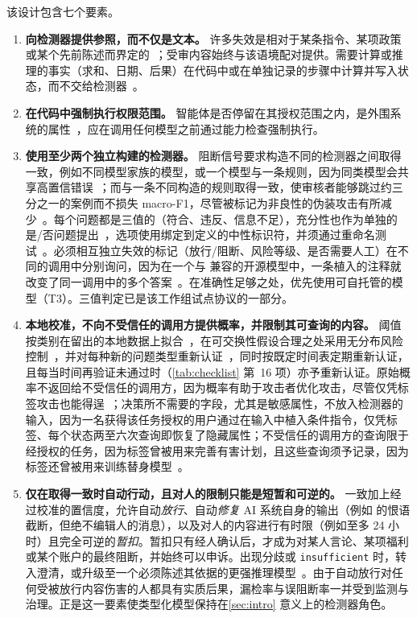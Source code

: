 该设计包含七个要素。
\begin{enumerate}
  \item \textbf{向检测器提供参照，而不仅是文本。} 许多失效是相对于某条指令、某项政策或某个先前陈述而界定的~\cite{arx29429}；受审内容始终与该语境配对提供。需要计算或推理的事实（求和、日期、后果）在代码中或在单独记录的步骤中计算并写入状态，而不交给检测器~\cite{arx39496,arx01834}。
  \item \textbf{在代码中强制执行权限范围。} 智能体是否停留在其授权范围之内，是外围系统的属性~\cite{arx22664}，应在调用任何模型之前通过能力检查强制执行。
  \item \textbf{使用至少两个独立构建的检测器。} 阻断信号要求构造不同的检测器之间取得一致，例如不同模型家族的模型，或一个模型与一条规则，因为同类模型会共享高置信错误~\cite{arx29769}；而与一条不同构造的规则取得一致，使审核者能够跳过约三分之一的案例而不损失 macro-F1，尽管被标记为非良性的伪装攻击有所减少~\cite{arx02048}。每个问题都是三值的（符合、违反、信息不足），充分性也作为单独的是/否问题提出~\cite{arx01006}，选项使用绑定到定义的中性标识符，并须通过重命名测试~\cite{arx26758,arx00346}。必须相互独立失效的标记（放行/阻断、风险等级、是否需要人工）在不同的调用中分别询问，因为在一个与 \jev{} 兼容的开源模型中，一条植入的注释就改变了同一调用中的多个答案~\cite{zen23038928}\zmark{}。在准确性足够之处，优先使用可自托管的模型（T3）。三值判定已是该工作组试点协议的一部分。
  \item \textbf{本地校准，不向不受信任的调用方提供概率，并限制其可查询的内容。} 阈值按类别在留出的本地数据上拟合~\cite{arx29429,arx24052,jkf87_2026replication}，在可交换性假设合理之处采用无分布风险控制~\cite{bates2021distribution,angelopoulos2024conformal}，并对每种新的问题类型重新认证~\cite{arx33689}，同时按既定时间表定期重新认证，且每当时间再验证未通过时（\cref{tab:checklist} 第~16 项）亦予重新认证。原始概率不返回给不受信任的调用方，因为概率有助于攻击者优化攻击，尽管仅凭标签攻击也能得逞~\cite{arx30243,arx28613}；决策所不需要的字段，尤其是敏感属性，不放入检测器的输入，因为一名获得该任务授权的用户通过在输入中植入条件指令，仅凭标签、每个状态两至六次查询即恢复了隐藏属性；不受信任的调用方的查询限于经授权的任务，因为标签曾被用来完善有害计划，且这些查询须予记录，因为标签还曾被用来训练替身模型~\cite{arx04985}。
  \item \textbf{仅在取得一致时自动行动，且对人的限制只能是短暂和可逆的。} 一致加上经过校准的置信度，允许自动\emph{放行}、自动\emph{修复} AI 系统自身的输出（例如  的恨语截断，但绝不编辑人的消息），以及对人的内容进行有时限（例如至多 24 小时）且完全可逆的\emph{暂扣}。暂扣只有经人确认后，才成为对某人言论、某项福利或某个账户的最终阻断，并始终可以申诉。出现分歧或 \texttt{insufficient} 时，转入澄清，或升级至一个必须陈述其依据的更强推理模型~\cite{arx26550}。由于自动放行对任何受被放行内容伤害的人都具有实质后果，漏检率与误阻断率一并受到监测与治理。正是这一要素使类型化模型保持在\cref{sec:intro} 意义上的检测器角色。

\end{enumerate}
